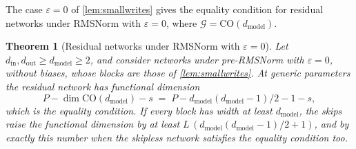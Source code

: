 \documentclass[10pt]{article}
\newtheorem{theorem}{Theorem}[section]
\theoremstyle{definition}
\theoremstyle{remark}
\newcommand{\dm}{d_{\mathrm{model}}}
\newcommand{\CO}{\mathrm{CO}}
\newcommand{\G}{\mathcal{G}}
\begin{document}
The case $\varepsilon = 0$ of \cref{lem:smallwrites} gives the equality condition for residual networks under RMSNorm with $\varepsilon = 0$, where $\G = \CO(\dm)$.

\begin{theorem}[Residual networks under RMSNorm with $\varepsilon = 0$]\label{thm:epszero}
Let $d_{\mathrm{in}}, d_{\mathrm{out}} \ge \dm \ge 2$, and consider networks under pre-RMSNorm with $\varepsilon = 0$, without biases, whose blocks are those of \cref{lem:smallwrites}. At generic parameters the residual network has functional dimension
\[
P - \dim\CO(\dm) - s \;=\; P - \dm(\dm-1)/2 - 1 - s ,
\]
which is the equality condition. If every block has width at least $\dm$, the skips raise the functional dimension by at least $L\,(\dm(\dm-1)/2 + 1)$, and by exactly this number when the skipless network satisfies the equality condition too.
\end{theorem}
\end{document}
